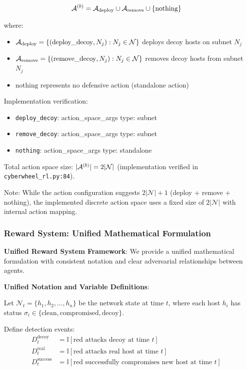 \documentclass[12pt,twoside]{article}
\theoremstyle{definition}
\theoremstyle{plain}
\begin{document}
\begin{equation}
\mathcal{A}^{(b)} = \mathcal{A}_{\text{deploy}} \cup \mathcal{A}_{\text{remove}} \cup \{\text{nothing}\}
\end{equation}

where:
\begin{itemize}
    \item $\mathcal{A}_{\text{deploy}} = \{(\text{deploy\_decoy}, N_j) : N_j \in \mathcal{N}\}$ deploys decoy hosts on subnet $N_j$
    \item $\mathcal{A}_{\text{remove}} = \{(\text{remove\_decoy}, N_j) : N_j \in \mathcal{N}\}$ removes decoy hosts from subnet $N_j$
    \item $\text{nothing}$ represents no defensive action (standalone action)
\end{itemize}

Implementation verification:
\begin{itemize}
    \item \texttt{deploy\_decoy}: action\_space\_args type: subnet
    \item \texttt{remove\_decoy}: action\_space\_args type: subnet  
    \item \texttt{nothing}: action\_space\_args type: standalone
\end{itemize}

Total action space size: $|\mathcal{A}^{(b)}| = 2|\mathcal{N}|$ (implementation verified in \texttt{cyberwheel\_rl.py:84}).

Note: While the action configuration suggests $2|\mathcal{N}| + 1$ (deploy + remove + nothing), the implemented discrete action space uses a fixed size of $2|\mathcal{N}|$ with internal action mapping.

\subsubsection{Reward System: Unified Mathematical Formulation}

\textbf{Unified Reward System Framework}: We provide a unified mathematical formulation with consistent notation and clear adversarial relationships between agents.

\textbf{Unified Notation and Variable Definitions}:

Let $\mathcal{N}_t = \{h_1, h_2, \ldots, h_n\}$ be the network state at time $t$, where each host $h_i$ has status $\sigma_i \in \{\text{clean}, \text{compromised}, \text{decoy}\}$. 

Define detection events:
\begin{align}
D_t^{\text{decoy}} &= \mathbb{I}[\text{red attacks decoy at time } t] \\
D_t^{\text{real}} &= \mathbb{I}[\text{red attacks real host at time } t] \\
D_t^{\text{success}} &= \mathbb{I}[\text{red successfully compromises new host at time } t]
\end{align}
\end{document}
